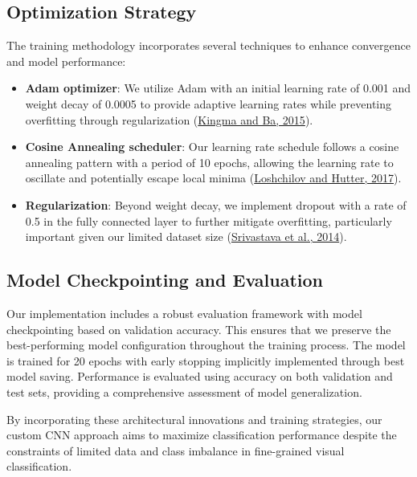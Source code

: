 \documentclass[a4paper,12pt]{article}
\begin{document}
\subsection{Optimization Strategy}

The training methodology incorporates several techniques to enhance convergence and model performance:

\begin{itemize}
    \item \textbf{Adam optimizer}: We utilize Adam with an initial learning rate of 0.001 and weight decay of 0.0005 to provide adaptive learning rates while preventing overfitting through regularization (\href{https://arxiv.org/abs/1412.6980}{Kingma and Ba, 2015}).
    
    \item \textbf{Cosine Annealing scheduler}: Our learning rate schedule follows a cosine annealing pattern with a period of 10 epochs, allowing the learning rate to oscillate and potentially escape local minima (\href{https://arxiv.org/abs/1608.03983}{Loshchilov and Hutter, 2017}).
    
    \item \textbf{Regularization}: Beyond weight decay, we implement dropout with a rate of 0.5 in the fully connected layer to further mitigate overfitting, particularly important given our limited dataset size (\href{https://jmlr.org/papers/v15/srivastava14a.html}{Srivastava et al., 2014}).
\end{itemize}

\subsection{Model Checkpointing and Evaluation}

Our implementation includes a robust evaluation framework with model checkpointing based on validation accuracy. This ensures that we preserve the best-performing model configuration throughout the training process. The model is trained for 20 epochs with early stopping implicitly implemented through best model saving. Performance is evaluated using accuracy on both validation and test sets, providing a comprehensive assessment of model generalization.

By incorporating these architectural innovations and training strategies, our custom CNN approach aims to maximize classification performance despite the constraints of limited data and class imbalance in fine-grained visual classification.



\end{document}
